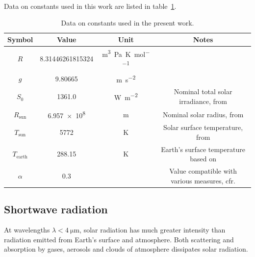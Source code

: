 \documentclass[a4paper,10pt,final,twocolumn]{article}
\begin{document}
Data on constants used in this work are listed in table~\ref{tab:constants}.
\begin{table}[h]
  \centering
  \caption{Data on constants used in the present work.}
  \label{tab:constants}
  \begin{tabular}[b]{cccc}
    \toprule
    Symbol           & Value                  & Unit                                           & Notes                                                            \\
    \midrule
    $R$              & \num{8.31446261815324} & \unit{\cubic\metre\pascal\per\kelvin\per\mole} &                                                                  \\
    $g$              & \num{9.80665}          & \unit{\metre\per\square\second}                &                                                                  \\
    $S_0$            & \num{1361.0}           & \unit{\watt\per\square\metre}                  & Nominal total solar irradiance, from \cite{IAU}                  \\
    $R_\text{sun}$   & \num{6.957e8}          & \unit{\metre}                                  & Nominal solar radius, from \cite{IAU}                            \\
    $T_\text{sun}$   & \num{5772}             & \unit{\kelvin}                                 & Solar surface temperature, from \cite{IAU}                       \\
    $T_\text{earth}$ & \num{288.15}           & \unit{\kelvin}                                 & Earth's surface temperature based on \cite{ISA}                  \\
    $\alpha$         & \num{0.3}              &                                                & Value compatible with various measures, cfr. \cite[1281]{albedo} \\
    \bottomrule
  \end{tabular}
\end{table}



\subsection{Shortwave radiation}
At wavelengths $\lambda < \qty{4}{\micro\metre}$, solar radiation has much greater intensity than radiation emitted from Earth's surface and atmosphere. Both scattering and absorption by gases, aerosols and clouds of atmosphere dissipates solar radiation.\cite[469]{ramanathan}
\end{document}
